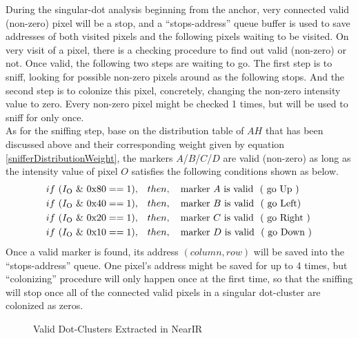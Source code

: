 %
During the singular-dot analysis beginning from the anchor, very connected valid (non-zero) pixel will be a stop, and a \enquote{stops-address} queue buffer is used to save addresses of both visited pixels and the following pixels waiting to be visited. On very visit of a pixel, there is a checking procedure to find out valid (non-zero) or not. Once valid, the following two steps are waiting to go. The first step is to sniff, looking for possible non-zero pixels around as the following stops. And the second step is to colonize this pixel, concretely, changing the non-zero intensity value to zero. Every non-zero pixel might be checked 1 times, but will be used to sniff for only once.%
\\\indent%
As for the sniffing step, base on the distribution table of \(A\)\texttildelow \(H\) that has been discussed above and their corresponding weight given by equation \ref{snifferDistributionWeight}, the markers \(A\)/\(B\)/\(C\)/\(D\) are valid (non-zero) as long as the intensity value of pixel \(O\) satisfies the following conditions shown as below.%
%
\begin{equation}
%
\begin{aligned}
if \,\, ( I_{\text{O}} \,\, \& \,\, \text{0x80}  == 1 ),\quad &then, \quad \text{marker } A\,\, \text{is valid \,\,( go Up )}%
\\%
if \,\, ( I_{\text{O}} \,\, \& \,\, \text{0x40}  == 1 ),\quad &then, \quad \text{marker } B\,\, \text{is valid \,\,( go  Left)}%
\\%
if \,\, ( I_{\text{O}} \,\, \& \,\, \text{0x20}  == 1 ),\quad &then, \quad \text{marker } C\,\,\text{is valid \,\,( go Right )}%
\\%
if \,\, ( I_{\text{O}} \,\, \& \,\, \text{0x10}  == 1 ),\quad &then,\quad \text{marker } D\,\,\text{is valid \,\,( go Down )}%
\\%
\end{aligned}
%
\end{equation}%
%
\noindent
Once a valid marker is found, its address \((column, row)\) will be saved into the \enquote{stops-address} queue. One pixel's address might be saved for up to 4 times, but \enquote{colonizing} procedure will only happen once at the first time, so that the sniffing will stop once all of the connected valid pixels in a singular dot-cluster are colonized as zeros.%
%
 \begin{figure}[t]
\hspace*{-0.5cm}
\centering
{}
{}
%
\caption{Valid Dot-Clusters Extracted in NearIR}
\label{DotCentersExtraction}
\end{figure}
